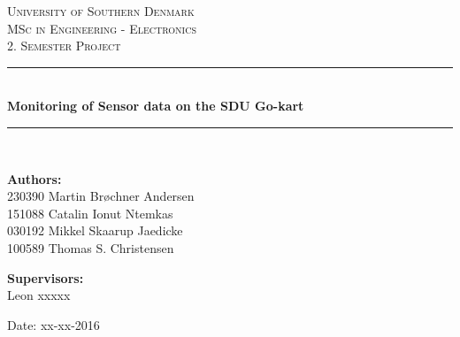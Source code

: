 \begin{titlepage}
\begin{center}

\textsc{\LARGE University of Southern Denmark}\\[1.5cm]
\textsc{\Large MSc in Engineering - Electronics}\\
\textsc{\large 2. Semester Project}\\[0.5cm]

\vfill
\vspace{3cm}
\hrule ~\\[0.3cm]
{ \LARGE \bfseries Monitoring of Sensor data on the SDU Go-kart\\[0.4cm] }
\hrule ~\\[1.5cm]

\vfill

\vspace{7cm}
\begin{minipage}[t]{.49\textwidth}
\begin{flushleft} \large
\textbf{Authors:}\\
230390 Martin Brøchner Andersen\\
151088 Catalin Ionut Ntemkas\\
030192 Mikkel Skaarup Jaedicke\\
100589 Thomas S. Christensen
\end{flushleft}
\end{minipage}
\begin{minipage}[t]{.49\textwidth}
\begin{flushright} \large
\textbf{Supervisors:} \\
Leon xxxxx
\end{flushright}
\end{minipage}

\vspace{1cm}
Date: xx-xx-2016

\vspace{1cm}

\end{center}
\end{titlepage}